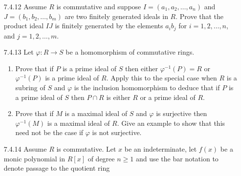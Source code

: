\begin{enumerate}
      \textbf{Proof.} Suppose that $I$ is not contained in $P$. It suffices to
      show that $J \subseteq P$. Since $I \not\subseteq P$, there exists
      $i \in I$ such that $i \notin P$. Let $j \in J$. Since $P$ contains $IJ$,
      it follows that $ij\in P$. Since $P$ is a prime ideal of $R$, we have that
      $i \in P$ or $j \in P$; but $i \notin P$, so we conclude that $j \in P$.
      Thus, $P \supseteq J$. \qed
   \item[7.4.12]  Assume $R$ is commutative and suppose
                  $I = (a_1, a_2, \ldots, a_n)$ and
                  $J = (b_1, b_2, \ldots, b_m)$ are two finitely generated
                  ideals in $R$. Prove that the product ideal $IJ$ is finitely
                  generated by the elements $a_ib_j$ for $i = 1, 2, \ldots, n$,
                  and $j = 1, 2, \ldots, m$.
   \item[7.4.13]  Let $\varphi : R \rightarrow S$ be a homomorphism of
                  commutative rings.
                  \begin{enumerate}
                     \item Prove that if $P$ is a prime ideal of $S$ then either
                           $\varphi^{-1}(P) = R$ or $\varphi^{-1}(P)$ is a prime
                           ideal of $R$. Apply this to the special case when $R$
                           is a subring of $S$ and $\varphi$ is the inclusion
                           homomorphism to deduce that if $P$ is a prime ideal
                           of $S$ then $P \cap R$ is either $R$ or a prime ideal
                           of $R$.
                     \item Prove that if $M$ is a maximal ideal of $S$ and
                           $\varphi$ is surjective then $\varphi^{-1}(M)$ is a
                           maximal ideal of $R$. Give an example to show that 
                           this need not be the case if $\varphi$ is not
                           surjective.
                  \end{enumerate}
   \item[7.4.14]  Assume $R$ is commutative. Let $x$ be an indeterminate, let
                  $f(x)$ be a monic polynomial in $R[x]$ of degree $n \ge 1$ and
                  use the bar notation to denote passage to the quotient ring

\end{enumerate}
